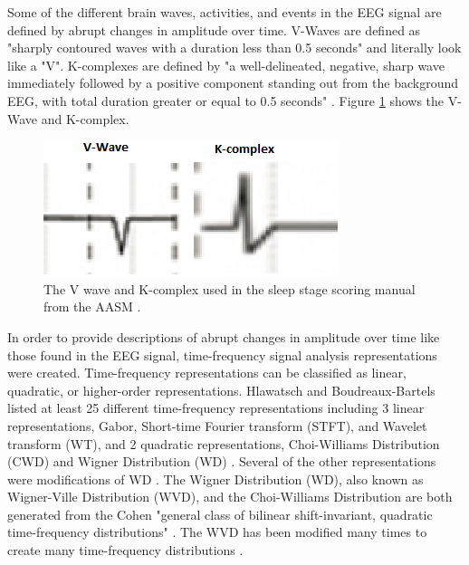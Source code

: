 \documentclass[12pt, oneside]{book}
\begin{document}
Some of the different brain waves, activities, and events in the EEG signal are defined by abrupt changes in amplitude over time. V-Waves are defined as "sharply contoured waves with a duration less than 0.5 seconds" \cite{berry_md_chair_aasm_nodate} and literally look like a "V". K-complexes are defined by "a well-delineated, negative, sharp wave immediately followed by a positive component standing out from the background EEG, with total duration greater or equal to 0.5 seconds" \cite{berry_md_chair_aasm_nodate}. Figure \ref{fig:kandv} shows the V-Wave and K-complex.


\begin{figure}[H]
	\centering
	\includegraphics[]{VandK.png}
	\caption{The V wave and K-complex used in the sleep stage scoring manual from the AASM \cite{berry_md_chair_aasm_nodate}.}
	\label{fig:kandv}
\end{figure}

In order to provide descriptions of abrupt changes in amplitude over time like those found in the EEG signal, time-frequency signal analysis representations were created. Time-frequency representations can be classified as linear, quadratic, or higher-order representations. Hlawatsch and Boudreaux-Bartels listed at least 25 different time-frequency representations including 3 linear representations, Gabor, Short-time Fourier transform (STFT), and Wavelet transform (WT), and 2 quadratic representations, Choi-Williams Distribution (CWD) and Wigner Distribution (WD) \cite{hlawatsch_linear_1992}. Several of the other representations were modifications of WD \cite{hlawatsch_linear_1992}. The Wigner Distribution (WD), also known as Wigner-Ville Distribution (WVD), and the Choi-Williams Distribution are both generated from the Cohen "general class of bilinear shift-invariant, quadratic time-frequency distributions" \cite{debnath_wavelet_2014}. The WVD has been modified many times to create many time-frequency distributions \cite{debnath_wavelet_2014} \cite{noauthor_time-frequency_nodate}.
\end{document}
